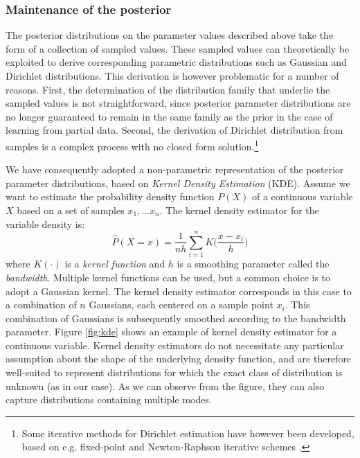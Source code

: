 \subsubsection*{Maintenance of the posterior}

The posterior distributions on the parameter values described above take the form of a collection of sampled values. These sampled values can theoretically be exploited to derive corresponding parametric distributions such as Gaussian and Dirichlet distributions.  This derivation is however problematic for a number of reasons.  First, the determination of the distribution family that underlie the sampled values is not straightforward, since posterior parameter distributions are no longer guaranteed to remain in the same family as the prior in the case of learning from partial data. Second, the derivation of Dirichlet distribution from samples is a complex process with no closed form solution.\footnote{Some iterative methods for Dirichlet estimation have however been developed, based on e.g. fixed-point and Newton-Raphson iterative schemes \citep{minka2003}.} 

We have consequently adopted a non-parametric representation of the posterior parameter distributions, based on \textit{Kernel Density Estimation} (KDE).  Assume we want to estimate the probability density function $P(X)$ of a continuous variable $X$ based on a set of samples $x_1, ... x_n$.  The kernel density estimator for the variable density is:
\begin{equation}
\hat{P}(X=x) = \frac{1}{nh} \sum_{i=1}^n K\Big(\frac{x-x_i}{h}\Big) \label{eq:kde}
\end{equation}
where $K(\cdot)$ is a \textit{kernel function} and $h$ is a smoothing parameter called the \textit{bandwidth}. Multiple kernel functions can be used, but a common choice is to adopt a Gaussian kernel. The kernel density estimator corresponds in this case to a combination of $n$ Gaussians, each centered on a sample point $x_i$.  This combination of Gaussians is subsequently smoothed according to the bandwidth parameter. Figure \ref{fig:kde} shows an example of kernel density estimator for a continuous variable. Kernel density estimators do not necessitate any particular assumption about the shape of the underlying density function, and are therefore well-suited to represent distributions for which the exact class of distribution is unknown (as in our case).  As we can observe from the figure, they can also capture distributions containing multiple modes. 

